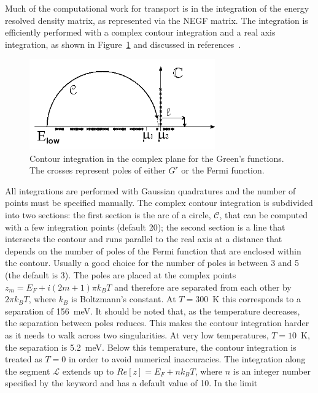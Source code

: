 Much of the computational work for transport is in the integration of the energy
resolved density matrix, as represented via the NEGF matrix. The integration is
efficiently performed with a complex contour integration and a real axis
integration, as shown in Figure~\ref{fig:contour} and discussed in
references~\cite{Pecchia_spring, Pecchia_RPP, Pecchia_NJP}.
\begin{figure}[!h]
  \begin{center}
    \includegraphics[width=8.0cm]{Fig_integration.png}
    \caption{ \label{fig:contour} Contour integration in the complex plane for
      the Green's functions. The crosses represent poles of either $G^r$ or the
      Fermi function.}
  \end{center}
\end{figure}
All integrations are performed with Gaussian quadratures and the number of
points must be specified manually. The complex contour integration is subdivided
into two sections: the first section is the arc of a circle, $\mathcal{C}$, that
can be computed with a few integration points (default 20); the second section
is a line that intersects the contour and runs parallel to the real axis at a
distance that depends on the number of poles of the Fermi function that are
enclosed within the contour. Usually a good choice for the number of poles is
between 3 and 5 (the default is 3). The poles are placed at the complex points
$z_m = E_F + i (2m+1) \pi k_B T$ and therefore are separated from each other by
$2 \pi k_B T$, where $k_B$ is Boltzmann's constant.  At $T=300$~K this
corresponds to a separation of 156~meV. It should be noted that, as the
temperature decreases, the separation between poles reduces. This makes the
contour integration harder as it needs to walk across two singularities. At very
low temperatures, $T=10$~K, the separation is 5.2~meV. Below this temperature,
the contour integration is treated as $T=0$ in order to avoid numerical
inaccuracies. The integration along the segment $\mathcal{L}$ extends up to
$Re\left[ z \right] = E_F + n k_B T$, where $n$ is an integer number specified
by the keyword  and has a default value of 10.  In the limit
